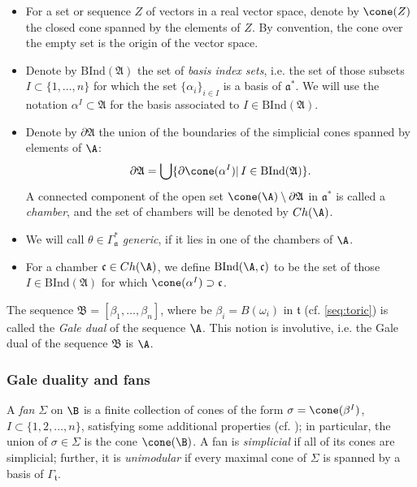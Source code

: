 \begin{itemize}\label{bind}


 
\item For a set or sequence $Z$ of vectors in a real vector space, denote by 
$\cone(Z)$ the closed cone spanned by the elements of $Z$. 
 By convention, the cone over the empty set is the origin of the vector space.

\item Denote by $\mathrm{BInd}(\mathfrak{A})$ the set of \textit{basis index 
sets}, i.e.  the set of those subsets $I \subset \{1, \ldots, n\}$ for which the 
set $\{\alpha_i\}_{i\in I}$ is a basis of $\mathfrak{a}^*$. We will use the 
notation $\alpha^I\subset \mathfrak{A}$ for the basis associated to $I\in 
\mathrm{BInd}(\mathfrak{A})$. 



\item Denote by $ \partial\mathfrak{A} $ the union of the boundaries of the 
simplicial cones spanned by elements of $ \A $:
\[ \partial\mathfrak{A} = \bigcup\{\partial\cone(\alpha^I)|\,I\in 
\mathrm{BInd}(\mathfrak{A})\}. \]
  A  connected component of the open set $\cone(\A) \setminus 
  \partial\mathfrak{A}$ 
  in $\mathfrak{a}^*$ is called a \textit{chamber}, and the set of chambers will be denoted by $Ch(\A)$.

\item We will call $\theta\in\Gamma_\mathfrak{a}^*$  \textit{generic}, if it 
lies in one of the  chambers of $\A$.

\item For a chamber $\mathfrak{c}\in Ch(\A)$, we define $\mathrm{BInd}(\A, \mathfrak{c})$ to be the set of those $I\in \mathrm{BInd}(\mathfrak{A})$  for which $\cone(\alpha^I)\supset \mathfrak{c}$.



\end{itemize}

The sequence $\mathfrak{B}=[\beta_1,\dots,\beta_n]$, where be  
$\beta_i=B(\omega_i)$ in $\mathfrak{t}$ (cf.  \eqref{seq:toric}) is called the 
\textit{Gale dual} of the sequence $\A$. This notion is involutive, i.e.  the 
Gale dual of the sequence $\mathfrak{B}$ is $ \A $.





\subsubsection{Gale duality and fans}
A \textit{fan} $ \Sigma $ on $ \B $ is a finite collection of cones  of the 
form $\sigma= \cone(\beta^I) $, $ I\subset\{1,2,\dots,n\} $, satisfying some 
additional properties (cf.  \cite[\S1.4]{Fulton}); in particular, the union of  
${\sigma\in\Sigma}$ is the cone $ \cone(\B)$.  A fan is \textit{simplicial} if 
all of its cones are simplicial; further, it is \textit{unimodular} if every 
maximal cone of $\Sigma$ is spanned by a basis of $\Gamma_\mathfrak{t}$.




